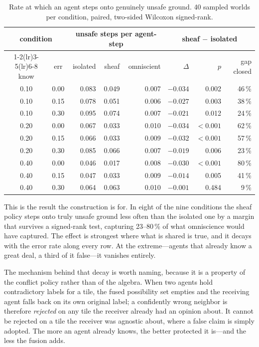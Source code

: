 \documentclass[11pt]{article}
\theoremstyle{definition}
\theoremstyle{remark}
\begin{document}
\begin{table}[h]
\centering
\small
\begin{tabular}{@{}cc rrr rrr@{}}
\toprule
\multicolumn{2}{c}{\textbf{condition}} & \multicolumn{3}{c}{\textbf{unsafe steps per agent-step}} & \multicolumn{3}{c}{\textbf{sheaf $-$ isolated}} \\
\cmidrule(lr){1-2}\cmidrule(lr){3-5}\cmidrule(lr){6-8}
know & err & isolated & sheaf & omniscient & $\Delta$ & $p$ & gap closed \\
\midrule
0.10 & 0.00 & 0.083 & 0.049 & 0.007 & $-0.034$ & 0.002 & 46\,\% \\
0.10 & 0.15 & 0.078 & 0.051 & 0.006 & $-0.027$ & 0.003 & 38\,\% \\
0.10 & 0.30 & 0.095 & 0.074 & 0.007 & $-0.021$ & 0.012 & 24\,\% \\
0.20 & 0.00 & 0.067 & 0.033 & 0.010 & $-0.034$ & $<0.001$ & 62\,\% \\
0.20 & 0.15 & 0.066 & 0.033 & 0.009 & $-0.032$ & $<0.001$ & 57\,\% \\
0.20 & 0.30 & 0.085 & 0.066 & 0.007 & $-0.019$ & 0.006 & 23\,\% \\
0.40 & 0.00 & 0.046 & 0.017 & 0.008 & $-0.030$ & $<0.001$ & 80\,\% \\
0.40 & 0.15 & 0.047 & 0.033 & 0.009 & $-0.014$ & 0.005 & 41\,\% \\
0.40 & 0.30 & 0.064 & 0.063 & 0.010 & $-0.001$ & 0.484 & 9\,\% \\
\bottomrule
\end{tabular}
\caption{Rate at which an agent steps onto genuinely unsafe ground. 40 sampled worlds per
condition, paired, two-sided Wilcoxon signed-rank.}
\label{tab:safety}
\end{table}

This is the result the construction is for.
In eight of the nine conditions the sheaf policy steps onto truly unsafe ground less often than
the isolated one by a margin that survives a signed-rank test, capturing 23--80\,\% of what
omniscience would have captured.
The effect is strongest where what is shared is true, and it decays with the error rate along
every row.
At the extreme---agents that already know a great deal, a third of it false---it vanishes
entirely.

The mechanism behind that decay is worth naming, because it is a property of the conflict
policy rather than of the algebra.
When two agents hold contradictory labels for a tile, the fused possibility set empties and the
receiving agent falls back on its own original label; a confidently wrong neighbor is therefore
\emph{rejected} on any tile the receiver already had an opinion about.
It cannot be rejected on a tile the receiver was agnostic about, where a false claim is simply
adopted.
The more an agent already knows, the better protected it is---and the less the fusion adds.
\end{document}
